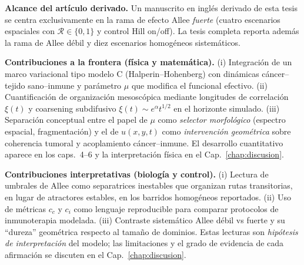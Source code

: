 \noindent\textbf{Alcance del artículo derivado.} Un manuscrito en inglés derivado de esta tesis se centra exclusivamente en la rama de efecto Allee \emph{fuerte} (cuatro escenarios espaciales con $\mathcal{R}\in\{0,1\}$ y control Hill on/off). La tesis completa reporta además la rama de Allee débil y diez escenarios homogéneos sistemáticos.

\noindent\textbf{Contribuciones a la frontera (física y matemática).} (i) Integración de un marco variacional tipo modelo C (Halperin--Hohenberg) con dinámicas cáncer--tejido sano--inmune y parámetro $\mu$ que modifica el funcional efectivo. (ii) Cuantificación de organización mesoscópica mediante longitudes de correlación $\xi(t)$ y coarsening subdifusivo $\xi(t)\sim e^{\alpha}t^{1/2}$ en el horizonte simulado. (iii) Separación conceptual entre el papel de $\mu$ como \emph{selector morfológico} (espectro espacial, fragmentación) y el de $u(x,y,t)$ como \emph{intervención geométrica} sobre coherencia tumoral y acoplamiento cáncer--inmune. El desarrollo cuantitativo aparece en los caps.~4--6 y la interpretación física en el Cap.~\ref{chap:discusion}.

\noindent\textbf{Contribuciones interpretativas (biología y control).} (i) Lectura de umbrales de Allee como separatrices inestables que organizan rutas transitorias, en lugar de atractores estables, en los barridos homogéneos reportados. (ii) Uso de métricas $c_c$ y $c_i$ como lenguaje reproducible para comparar protocolos de inmunoterapia modelada. (iii) Contraste sistemático Allee débil vs fuerte y su ``dureza'' geométrica respecto al tamaño de dominios. Estas lecturas son \emph{hipótesis de interpretación} del modelo; las limitaciones y el grado de evidencia de cada afirmación se discuten en el Cap.~\ref{chap:discusion}.



















